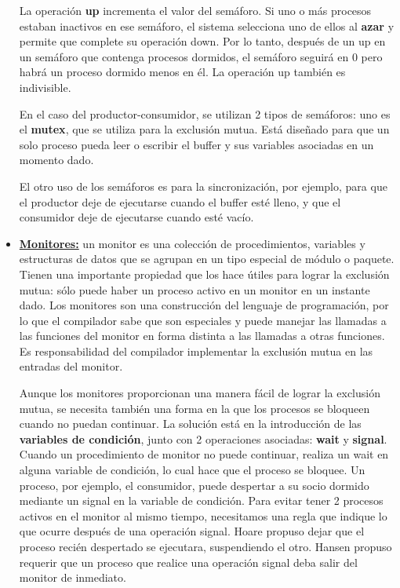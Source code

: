 \begin{itemize}
La operación \textbf{up} incrementa el valor del semáforo. Si uno o más procesos estaban inactivos en ese semáforo, el sistema selecciona uno de ellos al \textbf{azar} y permite que complete su operación down. Por lo tanto, después de un up en un semáforo que contenga procesos dormidos, el semáforo seguirá en $0$ pero habrá un proceso dormido menos en él. La operación up también es indivisible.

En el caso del productor-consumidor, se utilizan 2 tipos de semáforos: uno es el \textbf{mutex}, que se utiliza para la exclusión mutua. Está diseñado para que un solo proceso pueda leer o escribir el buffer y sus variables asociadas en un momento dado.

El otro uso de los semáforos es para la sincronización, por ejemplo, para que el productor deje de ejecutarse cuando el buffer esté lleno, y que el consumidor deje de ejecutarse cuando esté vacío.


\item \textbf{\underline{Monitores:}} un monitor es una colección de procedimientos, variables y estructuras de datos que se agrupan en un tipo especial de módulo o paquete. Tienen una importante propiedad que los hace útiles para lograr la exclusión mutua: sólo puede haber un proceso activo en un monitor en un instante dado. Los monitores son una construcción del lenguaje de programación, por lo que el compilador sabe que son especiales y puede manejar las llamadas a las funciones del monitor en forma distinta a las llamadas a otras funciones. Es responsabilidad del compilador implementar la exclusión mutua en las entradas del monitor.

Aunque los monitores proporcionan una manera fácil de lograr la exclusión mutua, se necesita también una forma en la que los procesos se bloqueen cuando no puedan continuar. La solución está en la introducción de las \textbf{variables de condición}, junto con 2 operaciones asociadas: \textbf{wait} y \textbf{signal}. Cuando un procedimiento de monitor no puede continuar, realiza un wait en alguna variable de condición, lo cual hace que el proceso se bloquee. Un proceso, por ejemplo, el consumidor, puede despertar a su socio dormido mediante un signal en la variable de condición. Para evitar tener 2 procesos activos en el monitor al mismo tiempo, necesitamos una regla que indique lo que ocurre después de una operación signal. Hoare propuso dejar que el proceso recién despertado se ejecutara, suspendiendo el otro. Hansen propuso requerir que un proceso que realice una operación signal deba salir del monitor de inmediato.
\end{itemize}

